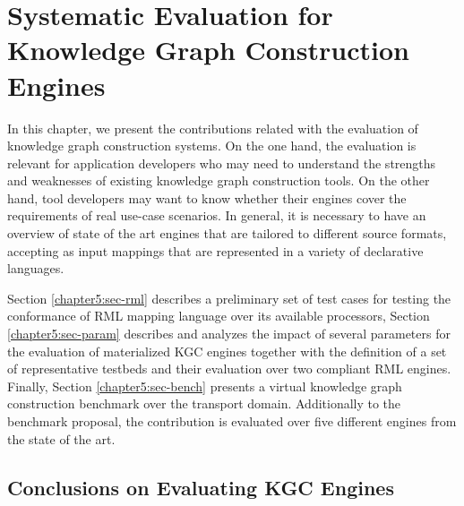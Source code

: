 \chapter{Systematic Evaluation for Knowledge Graph Construction Engines}
\label{chapter:evaluation}
In this chapter, we present the contributions related with the evaluation of knowledge graph construction systems. On the one hand, the evaluation is relevant for application developers who may need to understand the strengths and weaknesses of existing knowledge graph construction tools. On the other hand, tool developers may want to know whether their engines cover the requirements of real use-case scenarios. In general, it is necessary to have an overview of state of the art engines that are tailored to different source formats, accepting as input mappings that are represented in a variety of declarative languages. 

 Section \ref{chapter5:sec-rml} describes a preliminary set of test cases for testing the conformance of RML mapping language over its available processors, Section \ref{chapter5:sec-param} describes and analyzes the impact of several parameters for the evaluation of materialized KGC engines together with the definition of a set of representative testbeds and their evaluation over two compliant RML engines. Finally, Section \ref{chapter5:sec-bench} presents a virtual knowledge graph construction benchmark over the transport domain. Additionally to the benchmark proposal, the contribution is evaluated over five different engines from the state of the art.








\section{Conclusions on Evaluating KGC Engines}
